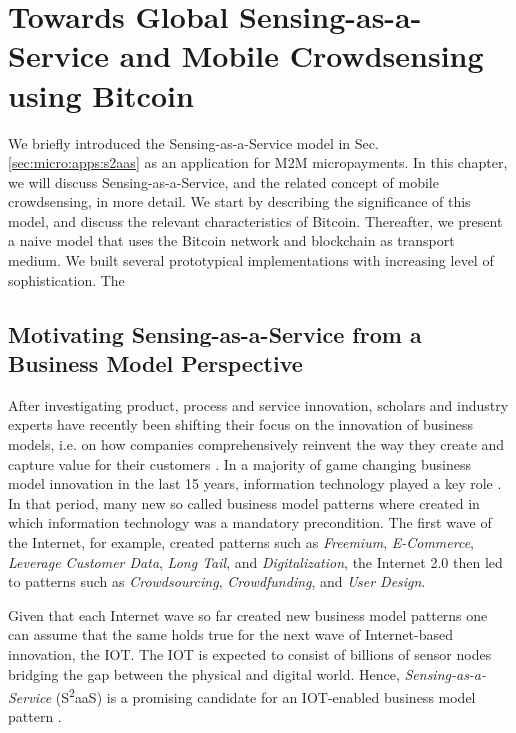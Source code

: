 \chapter{Towards Global Sensing-as-a-Service and Mobile Crowdsensing using Bitcoin}
\label{sec:datamarket}

We briefly introduced the Sensing-as-a-Service model in Sec. \ref{sec:micro:apps:s2aas} as an application for M2M micropayments. 
In this chapter, we will discuss Sensing-as-a-Service, and the related concept of mobile crowdsensing, in more detail.
We start by describing the significance of this model, and discuss the relevant characteristics of Bitcoin. Thereafter, we present a naive model that uses the Bitcoin network and blockchain as transport medium. We built several prototypical implementations with increasing level of sophistication. The 

\section{Motivating Sensing-as-a-Service from a Business Model Perspective}

After investigating product, process and service innovation, scholars and industry experts have recently been shifting their focus on the innovation of business models, i.e. on how companies comprehensively reinvent the way they create and capture value for their customers \parencite{osterwalder2010business, zott2011business, pohle2006ibm, gassmann2013st,timmers1998business}. In a majority of game changing business model innovation in the last 15 years, information technology played a key role \parencite{gassmann2013st}. In that period, many new so called business model patterns where created in which information technology was a mandatory precondition. The first wave of the Internet, for example, created patterns such as \emph{Freemium}, \emph{E-Commerce}, \emph{Leverage Customer Data}, \emph{Long Tail}, and \emph{Digitalization}, the Internet 2.0 then led to patterns such as \emph{Crowdsourcing}, \emph{Crowdfunding}, and \emph{User Design}. 

Given that each Internet wave so far created new business model patterns one can assume that the same holds true for the next wave of Internet-based innovation, the IOT. The IOT is expected to consist of billions of sensor nodes bridging the gap between the physical and digital world. Hence, \emph{Sensing-as-a-Service} (S\textsuperscript{2}aaS) is a promising candidate for an IOT-enabled business model pattern \parencite{weinberger,perera2014sensing, mizouni2013mobile, sheng2013sensing}.  

